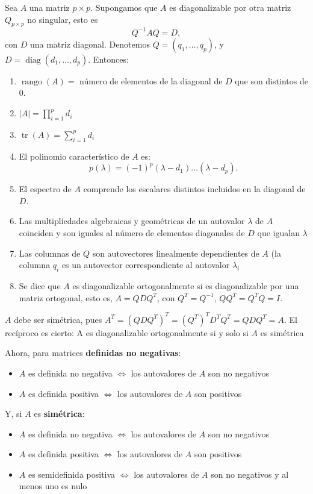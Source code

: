     \begin{nth}
      Sea $A$ una matriz $p\times p$. Supongamos que $A$ es diagonalizable por otra matriz $Q_{p \times p}$ no singular, esto es
      \[
      Q^{-1}AQ = D,
      \]
      con $D$ una matriz diagonal. Denotemos $Q = (q_1,\dots,q_p)$, y $D= \operatorname{diag}(d_1,\dots,d_p)$. Entonces:
      \begin{enumerate}
      \item $\operatorname{rango}(A) = $ número de elementos de la diagonal de $D$ que son distintos de 0.
      \item $|A| = \prod_{i = 1}^p d_i$
      \item $\operatorname{tr}(A) = \sum_{i = 1}^p d_i$
      \item El polinomio característico de $A$ es:
        \[
        p(\lambda) = (-1)^p (\lambda-d_1)\dots(\lambda-d_p).
        \]
      \item El espectro de $A$ comprende los escalares distintos incluidos en la diagonal de $D$.
      \item Las multiplicdades algebraicas y geométricas de un autovalor $\lambda$ de $A$ coinciden y son iguales al número de elementos diagonales de $D$ que igualan $\lambda$
      \item Las columnas de $Q$ son autovectores linealmente dependientes de $A$ (la columna $q_i$ es un autovector correspondiente al autovalor $\lambda_i$
      \item Se dice que $A$ es diagonalizable ortogonalmente si es diagonalizable por una matriz ortogonal, esto es, $A = QDQ^T$, con $Q^T = Q^{-1}$, $QQ^T = Q^TQ = I$.
    \end{enumerate}

\end{nth}
\begin{ncor}
              $A$ debe ser simétrica, pues $A^T = (QDQ^T)^T = (Q^T)^T D^T Q^T = QDQ^T = A$. El recíproco es cierto: A es diagonalizable ortogonalmente si y solo si $A$ es simétrica
\end{ncor}

Ahora, para matrices \textbf{definidas no negativas}:
\begin{itemize}
\item $A$ es definida no negativa $\iff$ los autovalores de $A$ son no negativos
\item $A$ es definida positiva $\iff $ los autovalores de $A$ son positivos
\end{itemize}
Y, si $A$ es \textbf{simétrica}:
\begin{itemize}
\item $A$ es definida no negativa $\iff$ los autovalores de $A$ son no negativos
\item $A$ es definida positiva $\iff$ los autovalores de $A$ son positivos
  \item $A$ es semidefinida positiva $\iff$ los autovalores de $A$ son no negativos y al menos uno es nulo

\end{itemize}

